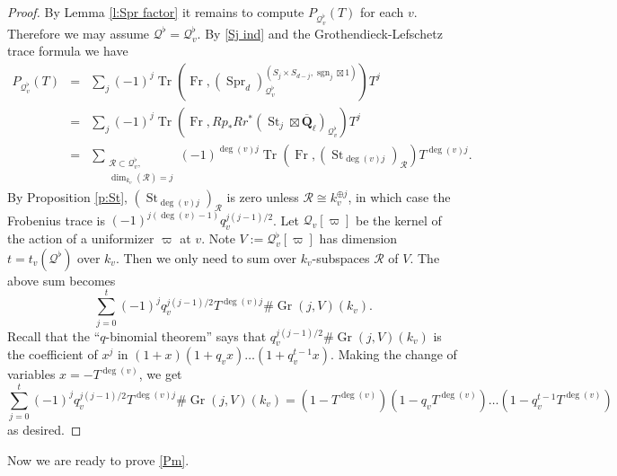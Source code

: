 \documentclass[reqno]{amsart}
\numberwithin{equation}{section}
\newcommand{\Q}{\mathbf{Q}}
\newcommand{\sgn}{\operatorname{sgn}}
\DeclareMathOperator{\Frob}{Fr}
\DeclareMathOperator{\Tr}{Tr}
\DeclareMathOperator{\Gr}{Gr}
\DeclareMathOperator{\Herm}{Herm}
\DeclareMathOperator{\St}{St}
\DeclareMathOperator{\Spr}{Spr}
\newcommand{\bt}{\boxtimes}
\newcommand{\Qlbar}{\overline{\Q}_\ell}
\newcommand\op{\oplus}
\newcommand{\y}{\eta}
\newcommand{\vp}{\varpi}
\newcommand\cQ{\mathcal{Q}}
\newcommand\cR{\mathcal{R}}
\theoremstyle{remark}
\numberwithin{equation}{section}
\begin{document}
\begin{proof}
By Lemma \ref{l:Spr factor} it remains to compute $P_{\cQ^{\flat}_{v}}(T)$ for each $v$. Therefore we may assume $\cQ^{\flat}=\cQ^{\flat}_{v}$.  By \eqref{Sj ind} and the Grothendieck-Lefschetz trace formula we have
\begin{eqnarray*}
P_{\cQ^{\flat}_{v}}(T)&=& \sum_{j}(-1)^{j}\Tr(\Frob, (\Spr_{d})^{(S_{j}\times S_{d-j}, \sgn_{j}\bt1)}_{\cQ^{\flat}_{v}})T^{j}\\
 &= &\sum_{j}(-1)^{j}\Tr(\Frob, Rp_{*}Rr^{*}(\St_{j}\bt\Qlbar)_{\cQ_{v}^{\flat}})T^j\\
&=& \sum_{\substack{\cR\subset \cQ^{\flat}_{v}, \\ \dim_{k_v} (\cR)=j}}(-1)^{\deg(v)j}\Tr(\Frob, (\St_{\deg(v)j})_{\cR})T^{\deg(v)j}.
\end{eqnarray*}
By Proposition \ref{p:St}, $(\St_{\deg(v)j})_{\cR}$ is zero unless $\cR\cong k_{v}^{\op j}$, in which case the Frobenius trace is $(-1)^{j(\deg(v)-1)}q_{v}^{j(j-1)/2}$. Let $\cQ_{v}[\vp]$ be the kernel of the action of a uniformizer $\vp$ at $v$. Note $V:=\cQ^{\flat}_{v}[\vp]$ has dimension $t=t_{v}(\cQ^{\flat})$ over $k_{v}$.  Then we only need to sum over $k_{v}$-subspaces $\cR$ of $V$. The above sum becomes
\begin{equation*}
\sum_{j=0}^{t}(-1)^{j}q_{v}^{j(j-1)/2}T^{\deg(v)j}\#\Gr(j,V)(k_{v}).
\end{equation*}
Recall that the ``$q$-binomial theorem'' says that $q_v^{j(j-1)/2} \# \Gr(j, V)(k_{v})$ is the coefficient of $x^j$ in $(1+x)(1+q_vx)\ldots(1+q_v^{t-1}x)$. Making the change of variables $x=-T^{\deg(v)}$, we get
\[
\sum_{j=0}^{t}(-1)^{j}q_{v}^{j(j-1)/2}T^{\deg(v)j}\#\Gr(j,V)(k_{v}) =(1-T^{\deg(v)})(1-q_{v}T^{\deg(v)})\ldots(1-q_v^{t-1}T^{\deg(v)})
\]
as desired.
\end{proof}






Now we are ready to prove \eqref{Pm}.

\end{document}
